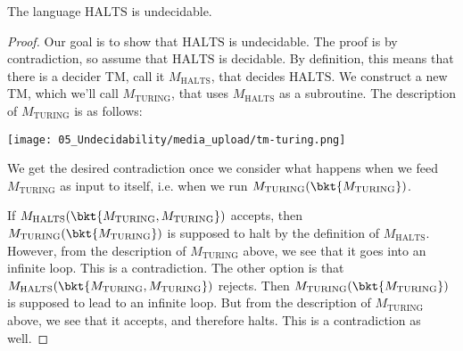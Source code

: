 \begin{flex}
\label{grp:theorem:Turings-Theorem}

\begin{theorem}
\label{theorem:Turings-Theorem}
The language $\mathrm{HALTS}$ is undecidable.

\end{theorem}

\begin{proof}
\label{prf:Undecidable-Languages::goal}
Our goal is to show that $\text{HALTS}$ is undecidable. The proof is by contradiction, so assume that $\text{HALTS}$ is decidable. By definition, this means that there is a decider TM, call it $M_\text{HALTS}$, that decides $\text{HALTS}$. We construct a new TM, which we'll call $M_\text{TURING}$, that uses $M_\text{HALTS}$ as a subroutine. The description of $M_\text{TURING}$ is as follows:

\begin{center}
\texttt{[image: 05\_Undecidability/media\_upload/tm-turing.png]}
\end{center}

We get the desired contradiction once we consider what happens when we feed $M_\text{TURING}$ as input to itself, i.e. when we run $M_\text{TURING}(\bkt{M_\text{TURING}})$. 

If $M_\text{HALTS}(\bkt{M_\text{TURING},M_\text{TURING}})$ accepts, then $M_\text{TURING}(\bkt{M_\text{TURING}})$ is supposed to halt by the definition of $M_\text{HALTS}$. However, from the description of $M_\text{TURING}$ above, we see that it goes into an infinite loop. This is a contradiction. The other option is that $M_\text{HALTS}(\bkt{M_\text{TURING},M_\text{TURING}})$ rejects. Then $M_\text{TURING}(\bkt{M_\text{TURING}})$ is supposed to lead to an infinite loop. But from the description of $M_\text{TURING}$ above, we see that it accepts, and therefore halts. This is a contradiction as well.

\end{proof}
\end{flex}


